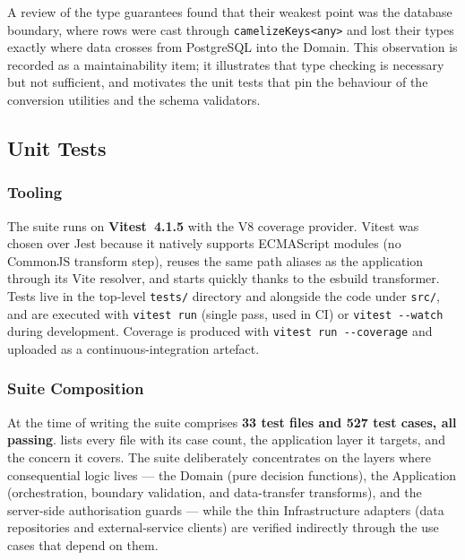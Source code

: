 A review of the type guarantees found that their weakest point was the
database boundary, where rows were cast through
\texttt{camelizeKeys<any>} and lost their types exactly where data crosses
from PostgreSQL into the Domain. This observation is recorded as a
maintainability item; it illustrates that type checking is necessary but
not sufficient, and motivates the unit tests that pin the behaviour of the
conversion utilities and the schema validators.

\subsection{Unit Tests}
\label{sec:val-unit}

\subsubsection{Tooling}

The suite runs on \textbf{Vitest~4.1.5} with the V8 coverage provider. Vitest
was chosen over Jest because it natively supports ECMAScript modules (no
CommonJS transform step), reuses the same path aliases as the application
through its Vite resolver, and starts quickly thanks to the esbuild
transformer. Tests live in the top-level \texttt{tests/} directory and
alongside the code under \texttt{src/}, and are executed with
\texttt{vitest run} (single pass, used in CI) or \texttt{vitest -{}-watch}
during development. Coverage is produced with \texttt{vitest run
-{}-coverage} and uploaded as a continuous-integration artefact.

\subsubsection{Suite Composition}

At the time of writing the suite comprises \textbf{33 test files and 527
test cases, all passing}.  lists every file
with its case count, the application layer it targets, and the concern it
covers. The suite deliberately concentrates on the layers where
consequential logic lives --- the Domain (pure decision functions), the
Application (orchestration, boundary validation, and data-transfer
transforms), and the server-side authorisation guards --- while the thin
Infrastructure adapters (data repositories and external-service clients) are
verified indirectly through the use cases that depend on them.


